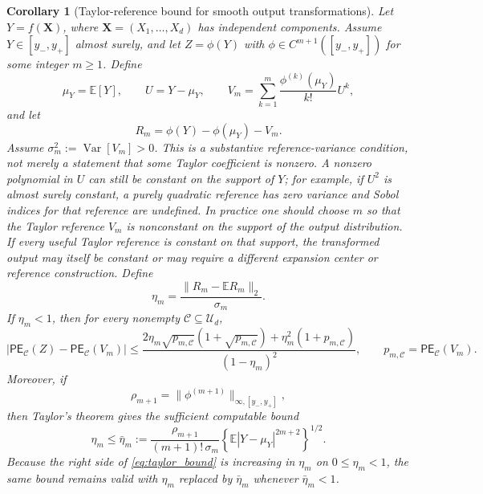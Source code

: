 \documentclass[11pt,letterpaper]{article}
\DeclareMathOperator{\Var}{Var}
\newcommand{\E}{\mathbb{E}}
\newcommand{\bX}{\boldsymbol{X}}
\newtheorem{corollary}{Corollary}
\theoremstyle{remark}
\begin{document}
\begin{corollary}[Taylor-reference bound for smooth output transformations]
\label{cor:taylor_bound}
Let $Y=f(\bX)$, where $\bX=(X_1,\ldots,X_d)$ has independent components. Assume
$Y\in[y_-,y_+]$ almost surely, and let $Z=\phi(Y)$ with
$\phi\in C^{m+1}([y_-,y_+])$ for some integer $m\geq1$. Define
\begin{equation}
  \mu_Y=\E[Y],
  \qquad
  U=Y-\mu_Y,
  \qquad
  V_m=\sum_{k=1}^{m}\frac{\phi^{(k)}(\mu_Y)}{k!}U^k,
  \label{eq:taylor_reference}
\end{equation}
and let
\begin{equation}
  R_m=\phi(Y)-\phi(\mu_Y)-V_m.
  \label{eq:taylor_remainder_def}
\end{equation}
Assume $\sigma_m^2:=\Var[V_m]>0$. This is a substantive reference-variance
condition, not merely a statement that some Taylor coefficient is nonzero. A
nonzero polynomial in $U$ can still be constant on the support of $Y$; for
example, if $U^2$ is almost surely constant, a purely quadratic reference has
zero variance and Sobol indices for that reference are undefined. In practice
one should choose $m$ so that the Taylor reference $V_m$ is nonconstant on the
support of the output distribution. If every useful Taylor reference is constant
on that support, the transformed output may itself be constant or may require a
different expansion center or reference construction.
Define
\begin{equation}
  \eta_m=\frac{\|R_m-\E R_m\|_2}{\sigma_m}.
  \label{eq:eta_m_def}
\end{equation}
If $\eta_m<1$, then for every nonempty $\mathscr C\subseteq\mathcal U_d$,
\begin{equation}
  \left|\mathsf{PE}_{\mathscr C}(Z)-\mathsf{PE}_{\mathscr C}(V_m)\right|
  \leq
  \frac{
    2\eta_m\sqrt{p_{m,\mathscr C}}(1+\sqrt{p_{m,\mathscr C}})
    +\eta_m^2(1+p_{m,\mathscr C})
  }{(1-\eta_m)^2},
  \qquad
  p_{m,\mathscr C}=\mathsf{PE}_{\mathscr C}(V_m).
  \label{eq:taylor_bound}
\end{equation}
Moreover, if
\begin{equation}
  \rho_{m+1}=\|\phi^{(m+1)}\|_{\infty,[y_-,y_+]},
\end{equation}
then Taylor's theorem gives the sufficient computable bound
\begin{equation}
  \eta_m
  \leq
  \bar\eta_m
  :=
  \frac{\rho_{m+1}}{(m+1)!\,\sigma_m}
  \left\{\E|Y-\mu_Y|^{2m+2}\right\}^{1/2}.
  \label{eq:eta_m_sufficient}
\end{equation}
Because the right side of \eqref{eq:taylor_bound} is increasing in $\eta_m$ on
$0\leq\eta_m<1$, the same bound remains valid with $\eta_m$ replaced by
$\bar\eta_m$ whenever $\bar\eta_m<1$.
\end{corollary}
\end{document}
